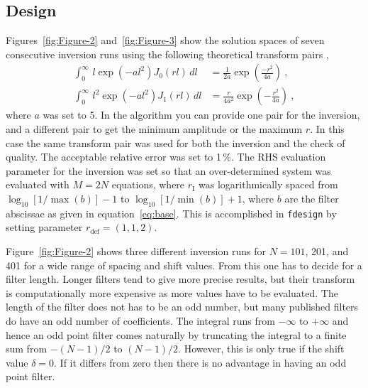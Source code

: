 \documentclass[paper,twocolumn,twoside]{geophysics}
\newcommand{\mr}[1]{\mathrm{#1}}
\begin{document}
\subsection{Design}
Figures~\ref{fig:Figure-2} and~\ref{fig:Figure-3} show the solution spaces of
seven consecutive inversion runs using the following theoretical transform
pairs \citep[e.g.,][]{USGS.75.Anderson},
%
\begin{align}
  \int^\infty_0\,l \exp\left(-al^2\right) J_0(rl)\,dl &=
  \frac{1}{2a} \exp\left(\frac{-r^2}{4a}\right)\ , \\
  \int^\infty_0\,l^2 \exp\left(-al^2\right) J_1(rl)\,dl &=
  \frac{r}{4a^2} \exp\left(-\frac{r^2}{4a}\right)\ ,
  \label{eq:j01}
\end{align}
%
where $a$ was set to 5. In the algorithm you can provide one pair
for the inversion, and a different pair to get the minimum amplitude or the
maximum $r$. In this case the same transform pair was used for both the
inversion and the check of quality. The acceptable relative error was set to
1\,\%. The RHS evaluation parameter for the inversion was set so  that an
over-determined system was evaluated with $M = 2N$ equations, where $r_\mr{I}$
was logarithmically spaced from $\log_{10}[1/\max(b)] - 1$ to
$\log_{10}[1/\min(b)] + 1$, where $b$ are the filter abscissae as given in
equation~\ref{eq:base}. This is accomplished in \texttt{fdesign} by setting
parameter $r_\mr{def} = (1, 1, 2)$.

Figure~\ref{fig:Figure-2} shows three different inversion runs for $N=101$,
201, and 401 for a wide range of spacing and shift values.
From this one has to decide for a filter length. Longer filters tend to give
more precise results, but their transform is computationally more expensive as
more values have to be evaluated. The length of the filter does not has to be
an odd number, but many published filters do have an odd number of
coefficients. The integral runs from $-\infty$ to $+\infty$ and hence an odd
point filter comes naturally by truncating the integral to a finite sum from
$-(N-1)/2$ to $(N-1)/2$. However, this is only true if the shift value
$\delta = 0$. If it differs from zero then there is no advantage in having an
odd point filter.
%
%
%
\end{document}
